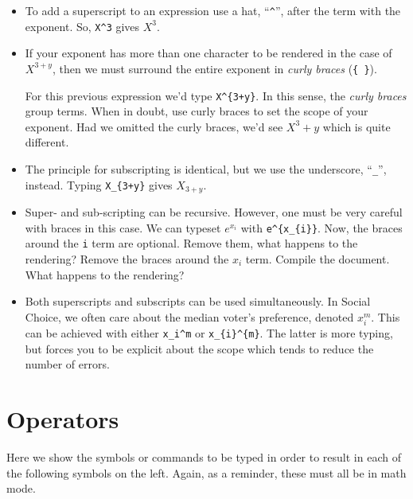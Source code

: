 \begin{itemize}

\item To add a superscript to an expression use a hat, ``\verb=^='', after the
  term with the exponent. So, \verb=X^3= gives $X^3$.

\item If your exponent has more than one character to be rendered in the case of
  $X^{3+y}$, then we must surround the entire exponent in \textit{curly braces}
  (\verb={ }=).

  For this previous expression we'd type \verb=X^{3+y}=. In this sense, the
  \textit{curly braces} group terms. When in doubt, use curly braces to set the
  scope of your exponent. Had we omitted the curly braces, we'd see $X^3+y$
  which is quite different.

\item The principle for subscripting is identical, but we use the underscore,
  ``\verb=_='', instead. Typing \verb=X_{3+y}= gives $X_{3 + y}$.

\item Super- and sub-scripting can be recursive. However, one must be very
  careful with braces in this case. We can typeset $e^{x_{i}}$ with
  \verb=e^{x_{i}}=. Now, the braces around the \texttt{i} term are
  optional. Remove them, what happens to the rendering? Remove the braces around
  the $x_i$ term. Compile the document. What happens to the rendering?

\item Both superscripts and subscripts can be used simultaneously. In Social
  Choice, we often care about the median voter's preference, denoted
  $x_i^m$. This can be achieved with either \verb=x_i^m= or
  \verb=x_{i}^{m}=. The latter is more typing, but forces you to be explicit
  about the scope which tends to reduce the number of errors.

\end{itemize}

\section{Operators}

Here we show the symbols or commands to be typed in order to result in each of
the following symbols on the left. Again, as a reminder, these must all be in
math mode.

